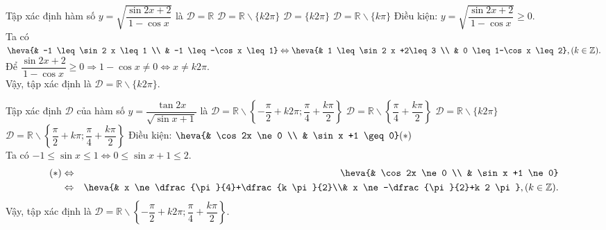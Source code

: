 \begin{ex}%
	Tập xác định hàm số $ y=\sqrt{\dfrac{\sin 2 x+2}{1-\cos x}} $ là 
	\choice
	{$ \mathscr{D}=\mathbb{R}  $}
	{\True$ \mathscr{D}=\mathbb{R} \backslash\{k 2 \pi\} $}
	{$ \mathscr{D}=\{k 2 \pi\} $}
	{$ \mathscr{D}=\mathbb{R} \backslash\{k \pi\} $}
	\loigiai
	{
		Điều kiện: $ y=\sqrt{\dfrac{\sin 2 x+2}{1-\cos x}} \geq 0 $.\\
		Ta có $ \heva{& -1 \leq \sin 2 x \leq 1 \\ & -1 \leq -\cos x \leq 1} \Leftrightarrow \heva{& 1 \leq \sin 2 x +2\leq 3 \\ & 0 \leq 1-\cos x \leq 2},(k \in \mathbb{Z}).$\\
		Để $\dfrac{\sin 2 x+2}{1-\cos x} \geq0 \Rightarrow 1-\cos x \ne 0 \Leftrightarrow  x \ne k 2 \pi $.\\
		Vậy, tập xác định là $ \mathscr{D}=\mathbb{R} \backslash\{k 2 \pi\} $.
	}
\end{ex}
\begin{ex}%
	Tập xác định $ \mathscr{D} $ của hàm số $ y=\dfrac{\tan 2 x}{\sqrt{\sin x+1}} $ là
	\choice
	{\True$ \mathscr{D}=\mathbb{R} \backslash\left\{-\dfrac{\pi}{2}+k 2 \pi ; \dfrac{\pi}{4}+\dfrac{k \pi}{2}\right\}  $}
	{$ \mathscr{D}=\mathbb{R} \backslash\left\{\dfrac{\pi}{4}+\dfrac{k \pi}{2}\right\}  $}
	{$ \mathscr{D}=\mathbb{R} \backslash\{k 2 \pi\}  $}
	{$ \mathscr{D}=\mathbb{R} \backslash\left\{\dfrac{\pi}{2}+k \pi ; \dfrac{\pi}{4}+\dfrac{k \pi}{2}\right\}  $}
	\loigiai
	{
		Điều kiện: $ \heva{& \cos 2x \ne 0 \\ & \sin x +1 \geq 0} (\ast)$\\
		Ta có $ -1 \leq \sin x \leq 1 \Leftrightarrow 0 \leq \sin x +1 \leq 2.$
		\begin{eqnarray*}
			(\ast) &\Leftrightarrow& \heva{& \cos 2x \ne 0  \\ & \sin x +1 \ne 0}\\
			&\Leftrightarrow& \heva{& x \ne \dfrac{\pi}{4}+\dfrac{k \pi}{2}\\& x \ne -\dfrac{\pi}{2}+k 2 \pi },(k \in \mathbb{Z}).
		\end{eqnarray*}
		Vậy, tập xác định là $ \mathscr{D}=\mathbb{R} \backslash\left\{-\dfrac{\pi}{2}+k 2 \pi ; \dfrac{\pi}{4}+\dfrac{k \pi}{2}\right\}.  $
	}
\end{ex}
